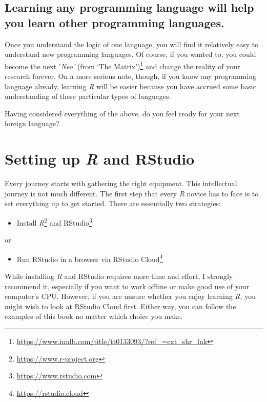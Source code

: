 \documentclass[
  letterpaper,
]{krantz}
\providecommand{\tightlist}{%
  \setlength{\itemsep}{0pt}\setlength{\parskip}{0pt}}\usepackage{longtable,booktabs,array}
\renewcommand{\href}[2]{#2\footnote{\url{#1}}}
\begin{document}
\section{Learning any programming language will help you learn other
programming
languages.}\label{learning-any-programming-language-will-help-you-learn-other-programming-languages.}

Once you understand the logic of one language, you will find it
relatively easy to understand new programming languages. Of course, if
you wanted to, you could become the next '\emph{Neo'} (from
\href{https://www.imdb.com/title/tt0133093/?ref_=ext_shr_lnk}{`The
Matrix')} and change the reality of your research forever. On a more
serious note, though, if you know any programming language already,
learning \emph{R} will be easier because you have accrued some basic
understanding of these particular types of languages.

Having considered everything of the above, do you feel ready for your
next foreign language?


\chapter{\texorpdfstring{Setting up \emph{R} and
RStudio}{Setting up R and RStudio}}\label{setting-up-r-and-rstudio}

Every journey starts with gathering the right equipment. This
intellectual journey is not much different. The first step that every
\emph{R} novice has to face is to set everything up to get started.
There are essentially two strategies:

\begin{itemize}
\tightlist
\item
  Install \href{https://www.r-project.org}{\emph{R}} and
  \href{https://www.rstudio.com}{RStudio}
\end{itemize}

or

\begin{itemize}
\tightlist
\item
  Run RStudio in a browser via \href{https://rstudio.cloud}{RStudio
  Cloud}
\end{itemize}

While installing \emph{R} and RStudio requires more time and effort, I
strongly recommend it, especially if you want to work offline or make
good use of your computer's CPU. However, if you are unsure whether you
enjoy learning \emph{R}, you might wish to look at RStudio Cloud first.
Either way, you can follow the examples of this book no matter which
choice you make.
\end{document}
